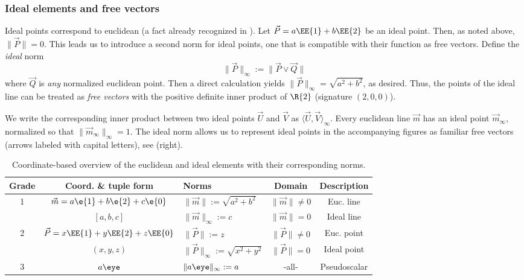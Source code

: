 \documentclass[12pt]{article}
\begin{document}
\subsubsection{Ideal elements and free vectors} Ideal points correspond to euclidean  (a fact already recognized in \cite{clifford73}). Let  $\vec{P} = a \EE{1} + b\EE{2}$ be an ideal point. Then, as noted above, $\| \vec{P} \| = 0$.  This leads us to  introduce a second norm for ideal points, one that is compatible with their function as free vectors.   Define the \emph{ideal} norm \[\| \vec{P} \|_{\infty} := \| \vec{P} \vee \vec{Q}\|\] where $\vec{Q}$ is \emph{any} normalized euclidean point. Then a direct calculation yields $\| \vec{P} \|_{\infty} = \sqrt{a^{2}+b^{2}}$, as desired.  Thus, the points of the ideal line can be treated as \emph{free vectors} with the  positive definite inner product of $\R{2}$ (signature $(2,0,0)$).   

We write the corresponding inner product between two ideal points $\vec{U}$ and $\vec{V}$ as $\langle \vec{U}, \vec{V} \rangle_{\infty}$.  Every euclidean line $\vec{m}$ has an ideal point $\vec{m}_{\infty}$,  normalized so that $\| \vec{m}_{\infty}\|_{\infty} = 1$.
The ideal norm allows us to represent ideal points  in the accompanying figures as familiar free vectors (arrows labeled with capital letters), see  (right).  

\begin{table}[t]
\begin{centering}
\renewcommand{\arraystretch}{1.25}
\begin{tabular}{| c | c |  l  |  c | c |}\hline
\textbf{Grade} &  \textbf{Coord. \& tuple form} & \textbf{Norms} & \textbf{Domain} & \textbf{Description} \\ \hline
1 	& {\small $\vec{m} = a \e{1} + b \e{2} + c\e{0} $} & $\|\vec{m}\| := \sqrt{a^2+b^2}$ & $\| \vec{m} \| \neq 0$ & Euc. line \\ \cline{3-5}
 	&  $[a, b, c]$ & $\|\vec{m}\|_\infty := c$ & $\| \vec{m} \| = 0$ & Ideal line \\ \hline
2 	& {\small $\vec{P} = x \EE{1} + y \EE{2} + z\EE{0}$} & $\|\vec{P}\| := z$ & $\| \vec{P} \| \neq 0$ & Euc. point\\ \cline{3-5}
 	&  $(x,y,z)$  & $\|\vec{P}\|_\infty :=\sqrt{x^2+y^2}$ & $\| \vec{P} \| = 0$ & Ideal point  \\ \hline
3 	& $a\eye$  & $\|a\eye\|_\infty :=a$ & -all- & Pseudoscalar \\ \hline
\end{tabular}
\vspace{.1in}
\caption{Coordinate-based overview of the euclidean and ideal elements with their corresponding norms.}
\label{tab:overview}
\end{centering}
\end{table}
\end{document}

